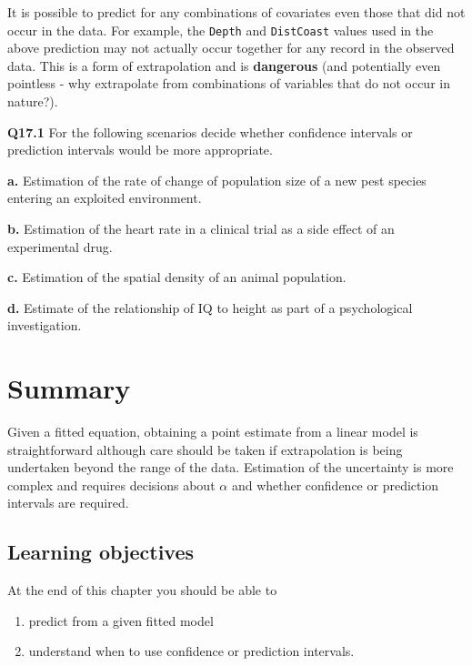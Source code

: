 \documentclass[
  oneside]{krantz}
\providecommand{\tightlist}{%
  \setlength{\itemsep}{0pt}\setlength{\parskip}{0pt}}
\begin{document}
It is possible to predict for any combinations of covariates even those that did not occur in the data. For example, the \texttt{Depth} and \texttt{DistCoast} values used in the above prediction may not actually occur together for any record in the observed data. This is a form of extrapolation and is \textbf{dangerous} (and potentially even pointless - why extrapolate from combinations of variables that do not occur in nature?).

\textbf{Q17.1} For the following scenarios decide whether confidence intervals or prediction intervals would be more appropriate.

\textbf{a.} Estimation of the rate of change of population size of a new pest species entering an exploited environment.

\textbf{b.} Estimation of the heart rate in a clinical trial as a side effect of an experimental drug.

\textbf{c.} Estimation of the spatial density of an animal population.

\textbf{d.} Estimate of the relationship of IQ to height as part of a psychological investigation.

\hypertarget{SUMpred}{%
\section{Summary}\label{SUMpred}}

Given a fitted equation, obtaining a point estimate from a linear model is straightforward although care should be taken if extrapolation is being undertaken beyond the range of the data. Estimation of the uncertainty is more complex and requires decisions about \(\alpha\) and whether confidence or prediction intervals are required.

\hypertarget{learning-objectives-6}{%
\subsection{Learning objectives}\label{learning-objectives-6}}

At the end of this chapter you should be able to

\begin{enumerate}
\def\labelenumi{\arabic{enumi}.}
\tightlist
\item
  predict from a given fitted model
\item
  understand when to use confidence or prediction intervals.
\end{enumerate}
\end{document}
